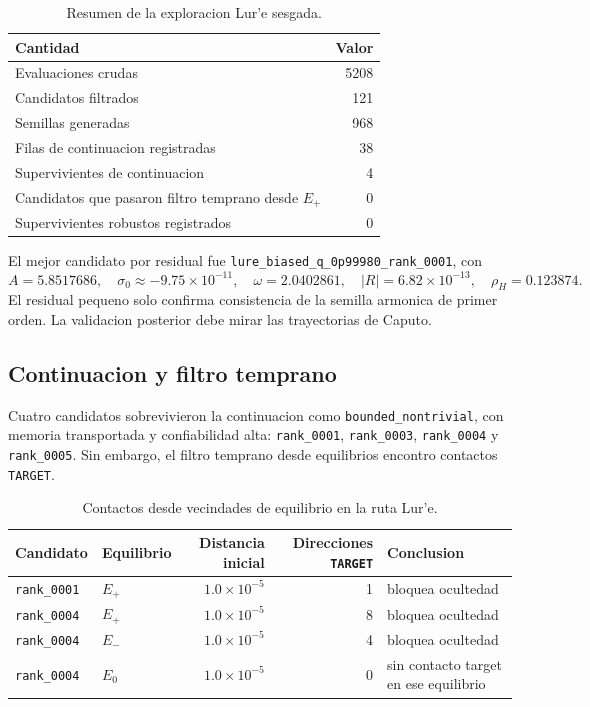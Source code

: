 \documentclass[11pt]{article}
\newcommand{\status}[1]{\texttt{\small #1}}
\newcommand{\target}{\texttt{TARGET}}
\newcommand{\Ezero}{E_0}
\newcommand{\Eplus}{E_+}
\newcommand{\Eminus}{E_-}
\begin{document}
\begin{table}[h]
\centering
\caption{Resumen de la exploracion Lur'e sesgada.}
\small
\begin{tabular}{lr}
\toprule
Cantidad & Valor \\
\midrule
Evaluaciones crudas & 5208 \\
Candidatos filtrados & 121 \\
Semillas generadas & 968 \\
Filas de continuacion registradas & 38 \\
Supervivientes de continuacion & 4 \\
Candidatos que pasaron filtro temprano desde \(E_+\) & 0 \\
Supervivientes robustos registrados & 0 \\
\bottomrule
\end{tabular}
\end{table}

El mejor candidato por residual fue
\status{lure\_biased\_q\_0p99980\_rank\_0001}, con
\[
A=5.8517686,\quad \sigma_0\approx -9.75\times10^{-11},\quad
\omega=2.0402861,\quad |R|=6.82\times10^{-13},\quad
\rho_H=0.123874.
\]
El residual pequeno solo confirma consistencia de la semilla armonica de primer
orden. La validacion posterior debe mirar las trayectorias de Caputo.

\subsection{Continuacion y filtro temprano}

Cuatro candidatos sobrevivieron la continuacion como
\status{bounded\_nontrivial}, con memoria transportada y confiabilidad alta:
\status{rank\_0001}, \status{rank\_0003}, \status{rank\_0004} y
\status{rank\_0005}. Sin embargo, el filtro temprano desde equilibrios encontro
contactos \target{}.

\begin{table}[h]
\centering
\caption{Contactos desde vecindades de equilibrio en la ruta Lur'e.}
\small
\begin{tabular}{llrrl}
\toprule
Candidato & Equilibrio & Distancia inicial & Direcciones \target{} & Conclusion \\
\midrule
\status{rank\_0001} & \(\Eplus\) & \(1.0\times10^{-5}\) & 1 & bloquea ocultedad \\
\status{rank\_0004} & \(\Eplus\) & \(1.0\times10^{-5}\) & 8 & bloquea ocultedad \\
\status{rank\_0004} & \(\Eminus\) & \(1.0\times10^{-5}\) & 4 & bloquea ocultedad \\
\status{rank\_0004} & \(\Ezero\) & \(1.0\times10^{-5}\) & 0 & sin contacto target en ese equilibrio \\
\bottomrule
\end{tabular}
\end{table}
\end{document}
